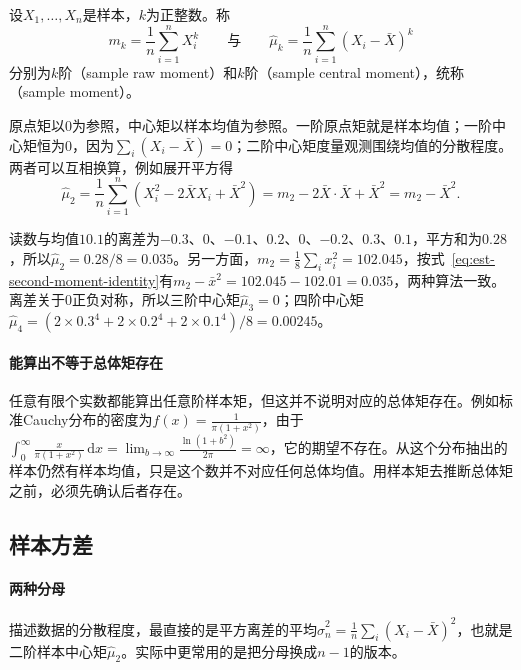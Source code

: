 \begin{definition}[样本矩]
\label{def:est-sample-moments}
设$X_1,\dots,X_n$是样本，$k$为正整数。称
\[
m_k=\frac1n\sum_{i=1}^nX_i^k
\qquad\text{与}\qquad
\hat\mu_k=\frac1n\sum_{i=1}^n(X_i-\bar X)^k
\]
分别为$k$阶（sample raw moment）和$k$阶（sample central moment），统称（sample moment）。
\end{definition}

原点矩以$0$为参照，中心矩以样本均值为参照。一阶原点矩就是样本均值；一阶中心矩恒为$0$，因为$\sum_i(X_i-\bar X)=0$；二阶中心矩度量观测围绕均值的分散程度。两者可以互相换算，例如展开平方得
\begin{equation}
\label{eq:est-second-moment-identity}
\hat\mu_2=\frac1n\sum_{i=1}^n(X_i^2-2\bar XX_i+\bar X^2)=m_2-2\bar X\cdot\bar X+\bar X^2=m_2-\bar X^2 .
\end{equation}

\begin{example}[读数的样本矩]
\label{ex:est-reading-moments}
读数与均值$10.1$的离差为$-0.3$、$0$、$-0.1$、$0.2$、$0$、$-0.2$、$0.3$、$0.1$，平方和为$0.28$，所以$\hat\mu_2=0.28/8=0.035$。另一方面，$m_2=\frac18\sum_ix_i^2=102.045$，按式~\eqref{eq:est-second-moment-identity}有$m_2-\bar x^2=102.045-102.01=0.035$，两种算法一致。离差关于$0$正负对称，所以三阶中心矩$\hat\mu_3=0$；四阶中心矩$\hat\mu_4=(2\times0.3^4+2\times0.2^4+2\times0.1^4)/8=0.00245$。
\end{example}

\paragraph{能算出不等于总体矩存在}
任意有限个实数都能算出任意阶样本矩，但这并不说明对应的总体矩存在。例如标准Cauchy分布的密度为$f(x)=\frac{1}{\pi(1+x^2)}$，由于$\int_0^\infty\frac{x}{\pi(1+x^2)}\,\mathrm{d}x=\lim_{b\to\infty}\frac{\ln(1+b^2)}{2\pi}=\infty$，它的期望不存在。从这个分布抽出的样本仍然有样本均值，只是这个数并不对应任何总体均值。用样本矩去推断总体矩之前，必须先确认后者存在。

\subsection{样本方差}
\label{sec:est-sample-variance}

\paragraph{两种分母}
描述数据的分散程度，最直接的是平方离差的平均$\hat\sigma_n^2=\frac1n\sum_i(X_i-\bar X)^2$，也就是二阶样本中心矩$\hat\mu_2$。实际中更常用的是把分母换成$n-1$的版本。

